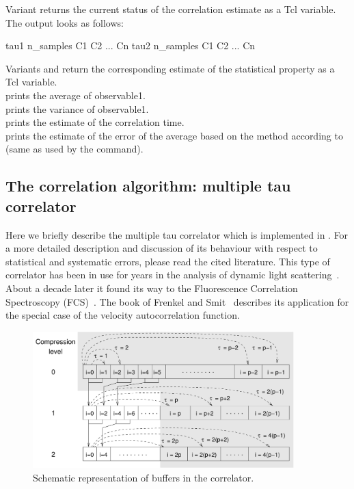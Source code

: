 Variant  returns the current status of the correlation
estimate as a Tcl variable. 
The output looks as follows:
\begin{code}
{ tau1 n_samples C1 C2 ... Cn }
{ tau2 n_samples C1 C2 ... Cn }
\end{code}

Variants  and  return the corresponding
estimate of the statistical property as a Tcl variable.             \\
 prints the average of observable1.                   \\
 prints the variance of observable1.                 \\
 prints the estimate of the correlation time. \\
 prints the estimate of the error of the average based
on the method according to~\cite{wolff04a} (same as 
used by the  command). 


\subsection{The correlation algorithm: multiple tau correlator}
\label{sec:multipleTau}

Here we briefly describe the multiple tau correlator which is implemented in \es.
For a more detailed description and discussion of its behaviour with respect to
statistical and systematic errors, please read the cited literature.
This type of correlator has been in use for years in the analysis of
dynamic light scattering~\cite{schatzel88a}. About a decade later it found its way
to the Fluorescence Correlation Spectroscopy (FCS)~\cite{magatti01a}.
The book of Frenkel and Smit~\cite{frenkel02b} describes its application
for the special case of the velocity autocorrelation function.

\begin{figure}[ht]
\begin{center} 
\includegraphics[width=0.9\textwidth]{figures/correlator_scheme}
\end{center} 
\caption{Schematic representation of buffers in the correlator.}
\label{fig:dataSet}
\end{figure}

